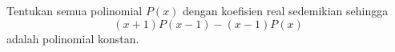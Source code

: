 Tentukan semua polinomial $P(x)$ dengan koefisien real sedemikian sehingga
\[ (x+1)P(x-1) - (x-1)P(x) \]
adalah polinomial konstan.
